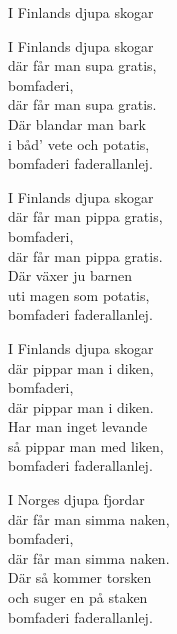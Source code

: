 \begin{song}{I Finlands djupa skogar}

    \showversenumber	
	I Finlands djupa skogar\\
	där får man supa gratis,\\
	bomfaderi,\\
	där får man supa gratis.\\
	Där blandar man bark\\
	i båd' vete och potatis,\\
	bomfaderi faderallanlej.
	
    \showversenumber
	I Finlands djupa skogar\\
	där får man pippa gratis,\\
	bomfaderi,\\
	där får man pippa gratis.\\
	Där växer ju barnen\\
	uti magen som potatis,\\
	bomfaderi faderallanlej.
	
	
    \showversenumber
	I Finlands djupa skogar\\
	där pippar man i diken,\\
	bomfaderi,\\
	där pippar man i diken.\\
	Har man inget levande\\
	så pippar man med liken,\\
	bomfaderi faderallanlej.
	
    \showversenumber
	I Norges djupa fjordar\\
	där får man simma naken,\\
	bomfaderi,\\
	där får man simma naken.\\
	Där så kommer torsken\\
	och suger en på staken\\
	bomfaderi faderallanlej.
	
\end{song}
